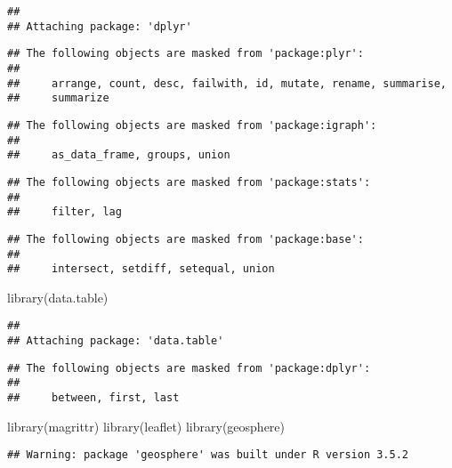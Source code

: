 \documentclass[
]{article}
\newenvironment{Shaded}{\begin{snugshade}}{\end{snugshade}}
\newcommand{\FunctionTok}[1]{\textcolor[rgb]{0.00,0.00,0.00}{#1}}
\newcommand{\NormalTok}[1]{#1}
\begin{document}
\begin{verbatim}
## 
## Attaching package: 'dplyr'
\end{verbatim}

\begin{verbatim}
## The following objects are masked from 'package:plyr':
## 
##     arrange, count, desc, failwith, id, mutate, rename, summarise,
##     summarize
\end{verbatim}

\begin{verbatim}
## The following objects are masked from 'package:igraph':
## 
##     as_data_frame, groups, union
\end{verbatim}

\begin{verbatim}
## The following objects are masked from 'package:stats':
## 
##     filter, lag
\end{verbatim}

\begin{verbatim}
## The following objects are masked from 'package:base':
## 
##     intersect, setdiff, setequal, union
\end{verbatim}

\begin{Shaded}
\begin{Highlighting}[]
\FunctionTok{library}\NormalTok{(data.table)}
\end{Highlighting}
\end{Shaded}

\begin{verbatim}
## 
## Attaching package: 'data.table'
\end{verbatim}

\begin{verbatim}
## The following objects are masked from 'package:dplyr':
## 
##     between, first, last
\end{verbatim}

\begin{Shaded}
\begin{Highlighting}[]
\FunctionTok{library}\NormalTok{(magrittr)}
\FunctionTok{library}\NormalTok{(leaflet)}
\FunctionTok{library}\NormalTok{(geosphere)}
\end{Highlighting}
\end{Shaded}

\begin{verbatim}
## Warning: package 'geosphere' was built under R version 3.5.2
\end{verbatim}
\end{document}
